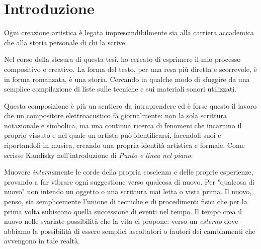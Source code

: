 

\chapter*{Introduzione}

Ogni creazione artistica è legata imprescindibilmente sia alla carriera accademica che alla storia personale di chi la scrive.

Nel corso della stesura di questa tesi, ho cercato di esprimere il mio processo compositivo e creativo. La forma del testo, per una resa più diretta e scorrevole, è in forma romanzata, è una storia. Cercando in qualche modo di sfuggire da una semplice compilazione di liste sulle tecniche e sui materiali sonori utilizzati.

Questa composizione è più un sentiero da intraprendere ed è forse questo il lavoro che un compositore elettroacustico fa giornalmente: non la sola scrittura notazionale e simbolica, ma una continua ricerca di fenomeni che incarnino il proprio vissuto e nel quale un artista può identificarsi, facendoli suoi e riportandoli in musica, creando una propria identità artistica e formale. Come scrisse Kandisky nell'introduzione di \textit{Punto e linea nel piano}: 


Muovere \textit{interna}mente le corde della propria coscienza e delle proprie esperienze, provando a far vibrare ogni suggestione verso qualcosa di nuovo. Per "qualcosa di nuovo" non intendo un oggetto o una scrittura mai letta o vista prima. Il nuovo, penso, sia semplicemente l'unione di tecniche e di procedimenti fisici che per la prima volta subiscono quella successione di eventi nel tempo. Il tempo crea il nuovo nelle svariate possibilit\`a che la vita ci propone: verso un \textit{esterno} dove abbiamo la possibilit\`a di essere semplici ascoltatori o fautori dei cambiamenti che avvengono in tale realtà. 